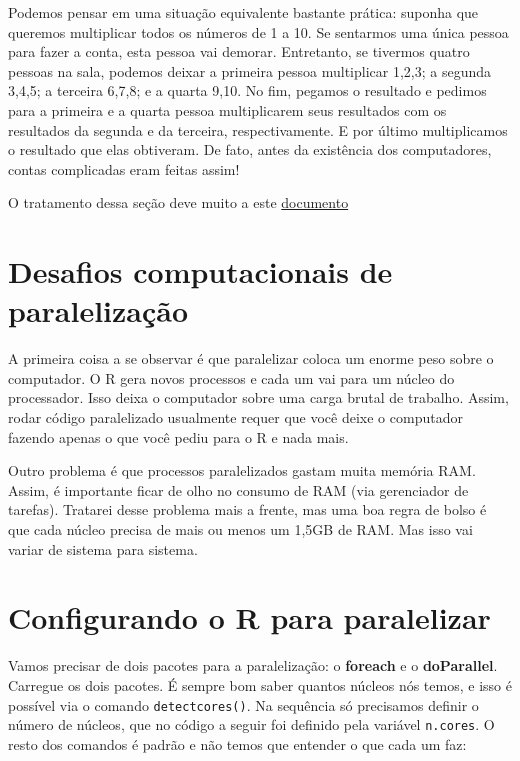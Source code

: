 \documentclass[]{book}
\begin{document}
Podemos pensar em uma situação equivalente bastante prática: suponha que
queremos multiplicar todos os números de 1 a 10. Se sentarmos uma única
pessoa para fazer a conta, esta pessoa vai demorar. Entretanto, se
tivermos quatro pessoas na sala, podemos deixar a primeira pessoa
multiplicar 1,2,3; a segunda 3,4,5; a terceira 6,7,8; e a quarta 9,10.
No fim, pegamos o resultado e pedimos para a primeira e a quarta pessoa
multiplicarem seus resultados com os resultados da segunda e da
terceira, respectivamente. E por último multiplicamos o resultado que
elas obtiveram. De fato, antes da existência dos computadores, contas
complicadas eram feitas assim!

O tratamento dessa seção deve muito a este
\href{http://michaeljkoontz.weebly.com/uploads/1/9/9/4/19940979/parallel.pdf}{documento}

\section{Desafios computacionais de
paralelização}\label{desafios-computacionais-de-paralelizacao}

A primeira coisa a se observar é que paralelizar coloca um enorme peso
sobre o computador. O R gera novos processos e cada um vai para um
núcleo do processador. Isso deixa o computador sobre uma carga brutal de
trabalho. Assim, rodar código paralelizado usualmente requer que você
deixe o computador fazendo apenas o que você pediu para o R e nada mais.

Outro problema é que processos paralelizados gastam muita memória RAM.
Assim, é importante ficar de olho no consumo de RAM (via gerenciador de
tarefas). Tratarei desse problema mais a frente, mas uma boa regra de
bolso é que cada núcleo precisa de mais ou menos um 1,5GB de RAM. Mas
isso vai variar de sistema para sistema.

\section{Configurando o R para
paralelizar}\label{configurando-o-r-para-paralelizar}

Vamos precisar de dois pacotes para a paralelização: o \textbf{foreach}
e o \textbf{doParallel}. Carregue os dois pacotes. É sempre bom saber
quantos núcleos nós temos, e isso é possível via o comando
\texttt{detectcores()}. Na sequência só precisamos definir o número de
núcleos, que no código a seguir foi definido pela variável
\texttt{n.cores}. O resto dos comandos é padrão e não temos que entender
o que cada um faz:
\end{document}
